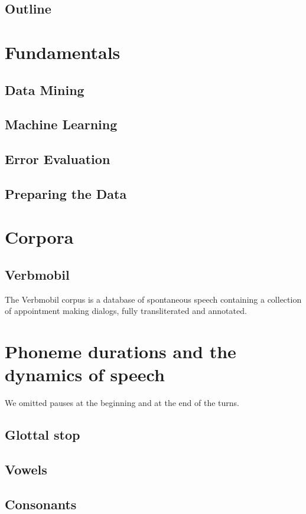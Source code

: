 \documentclass[a4paper]{scrreprt}
\begin{document}
\section{Outline}

\chapter{Fundamentals}
\section{Data Mining}
\section{Machine Learning}
\section{Error Evaluation}
\section{Preparing the Data}

\chapter{Corpora}
\section{Verbmobil}
The Verbmobil corpus is a database of spontaneous speech containing a collection of appointment making dialogs, fully transliterated and annotated.

\chapter{Phoneme durations and the dynamics of speech}
We omitted pauses at the beginning and at the end of the turns.

\section{Glottal stop}
\section{Vowels}
\section{Consonants}
\end{document}

